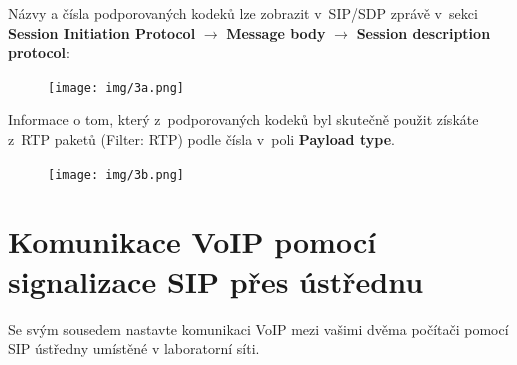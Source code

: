 Názvy a čísla podporovaných kodeků lze zobrazit v SIP/SDP zprávě v sekci {\bf Session Initiation Protocol} $\rightarrow$ {\bf Message body} $\rightarrow$ {\bf Session description protocol}:
\begin{figure}[h!]
  \centering
  \texttt{[image: img/3a.png]}
\end{figure}

\noindent Informace o tom, který z podporovaných kodeků byl skutečně použit získáte z RTP paketů (Filter: RTP) podle čísla v poli {\bf Payload type}.
\begin{figure}[h!]
  \centering
  \texttt{[image: img/3b.png]}
\end{figure}


\section{Komunikace VoIP pomocí signalizace SIP přes ústřednu}
Se svým sousedem nastavte komunikaci VoIP mezi vašimi dvěma počítači pomocí SIP ústředny umístěné v laboratorní síti.

